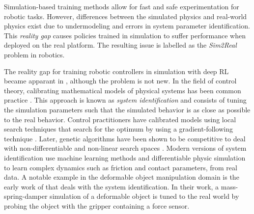 \documentclass[\home/main.tex]{subfiles}
\begin{document}
Simulation-based training methods allow for fast and safe experimentation for robotic tasks. However, differences between the simulated physics and real-world physics exist due to undermodeling and errors in system parameter identification. This \emph{reality gap} causes policies trained in simulation to suffer performance when deployed on the real platform. The resulting issue is labelled as the \emph{Sim2Real} problem in robotics.

The reality gap for training robotic controllers in simulation with deep RL became apparant in \autocite{Zhang2015}, although the problem is not new. In the field of control theory, calibrating mathematical models of physical systems has been common practice \autocite{ljung1983theory}. This approach is known as \emph{system identification} and consists of tuning the simulation parameters such that the simulated behavior is as close as possible to the real behavior. Control practitioners have calibrated models using local search techniques that search for the optimum by using a gradient-following technique \autocite{ljung1983theory}. Later, genetic algorithms have been shown to be competitive to deal with non-differentiable and non-linear search spaces \autocite{Kristinsson1992}. Modern versions of system identification use machine learning methods \autocite{chebotar2019closing} and differentiable physic simulation \autocite{heiden2021neuralsim} to learn complex dynamics such as friction and contact parameters, from real data. A notable example in the deformable object manipulation domain is the early work of \textcite{Howard2000} that deals with the system identification. In their work, a mass-spring-damper simulation of a deformable object is tuned to the real world by probing the object with the gripper containing a force sensor.
\end{document}

